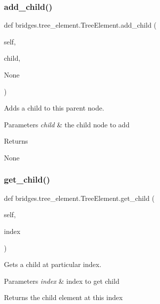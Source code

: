 \subsubsection{\texorpdfstring{add\+\_\+child()}{add\_child()}}
{\footnotesize\ttfamily def bridges.\+tree\+\_\+element.\+Tree\+Element.\+add\+\_\+child (\begin{DoxyParamCaption}\item[{}]{self,  }\item[{}]{child,  }\item[{}]{None }\end{DoxyParamCaption})}



Adds a child to this parent node. 


\begin{DoxyParams}{Parameters}
{\em child} & the child node to add \\
\hline
\end{DoxyParams}
\begin{DoxyReturn}{Returns}


None 
\end{DoxyReturn}
\mbox{\label{classbridges_1_1tree__element_1_1_tree_element_a137df45ceccca2cf489ea6df5719400e}} 
\subsubsection{\texorpdfstring{get\+\_\+child()}{get\_child()}}
{\footnotesize\ttfamily def bridges.\+tree\+\_\+element.\+Tree\+Element.\+get\+\_\+child (\begin{DoxyParamCaption}\item[{}]{self,  }\item[{}]{index }\end{DoxyParamCaption})}



Gets a child at particular index. 


\begin{DoxyParams}{Parameters}
{\em index} & index to get child \\
\hline
\end{DoxyParams}
\begin{DoxyReturn}{Returns}
the child element at this index
\end{DoxyReturn}

